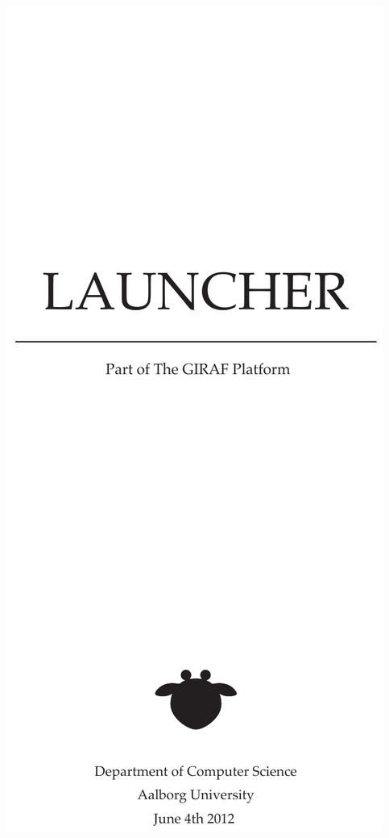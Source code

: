 
\begin{titlepage}
%





\begin{addmargin}[-1cm]{-3cm}
\begin{center}
% 
% 
% 
% 
% 
\vfill

\includegraphics[]{gfx/frontpage} \\ \medskip %

\end{center}
\end{addmargin}
\end{titlepage}
